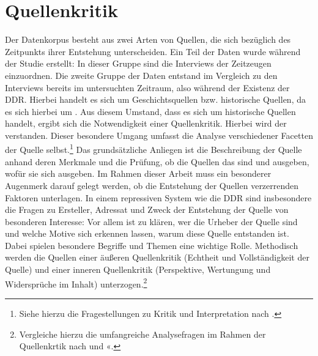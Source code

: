 \section{Quellenkritik}
Der Datenkorpus besteht aus zwei Arten von Quellen, die sich bezüglich des Zeitpunkts ihrer Entstehung unterscheiden.
Ein Teil der Daten wurde während der Studie erstellt:
In dieser Gruppe sind die Interviews der Zeitzeugen einzuordnen.
Die zweite Gruppe der Daten entstand im Vergleich zu den Interviews bereits im untersuchten Zeitraum, also während der Existenz der DDR.
Hierbei handelt es sich um Geschichtsquellen bzw. historische Quellen, da es sich hierbei um \autocite[29]{Kirn1959}.
Aus diesem Umstand, dass es sich um historische Quellen handelt, ergibt sich die Notwendigkeit einer Quellenkritik.\autocite[78]{Eckert2019} 
Hierbei wird der \autocite[45]{Jordan2018} verstanden.
Dieser besondere Umgang umfasst die Analyse verschiedener Facetten der Quelle selbst.\footnote{Siehe hierzu die Fragestellungen zu Kritik und Interpretation nach \textcite[162]{Borowsky1989}.}
Das grundsätzliche Anliegen ist die Beschreibung der Quelle anhand deren Merkmale und die Prüfung, ob die Quellen das sind und ausgeben, wofür sie sich ausgeben. %
Im Rahmen dieser Arbeit muss ein besonderer Augenmerk darauf gelegt werden, ob die Entstehung der Quellen verzerrenden Faktoren unterlagen.
In einem repressiven System wie die DDR sind insbesondere die Fragen zu Ersteller, Adressat und Zweck der Entstehung der Quelle von besonderen Interesse: 
Vor allem ist zu klären, wer die Urheber der Quelle sind und welche Motive sich erkennen lassen, warum diese Quelle entstanden ist.
Dabei spielen besondere Begriffe und Themen eine wichtige Rolle.
Methodisch werden die Quellen einer äußeren Quellenkritik (Echtheit und Vollständigkeit der Quelle)\autocite[67]{Budde2008} und einer inneren Quellenkritik (Perspektive, Wertungung und Widersprüche im Inhalt)\autocite[67]{Budde2008} unterzogen.\footnote{Vergleiche hierzu die umfangreiche Analysefragen im Rahmen der Quellenkrtik nach \textcite[78\psq]{Eckert2019} und \textcite[67]{Budde2008} «.} 

%
